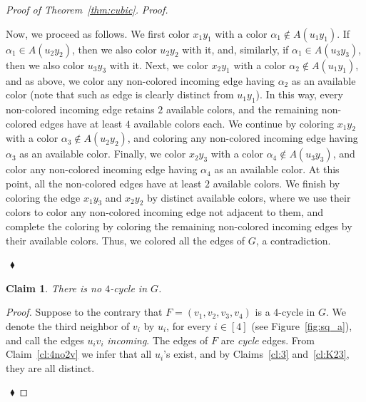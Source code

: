 \documentclass[12pt,a4paper]{article}
\newtheorem{claim}{Claim}
\newenvironment{proofclaim}[1][]%
    {\noindent \emph{Proof.} {}{#1}{}}{$~$\hfill $~\blacklozenge$ \vspace{0.2cm}}
\begin{document}
\begin{proof}[Proof of Theorem~\ref{thm:cubic}]
\begin{proofclaim}
\begin{itemize}
				Now, we proceed as follows.
				We first color $x_1y_1$ with a color $\alpha_1 \notin A(u_1y_1)$. 
				If $\alpha_1 \in A(u_2y_2)$, then we also color $u_2y_2$ with it, 
				and, similarly, if $\alpha_1 \in A(u_3y_3)$, then we also color $u_3y_3$ with it.
				Next, we color $x_2y_1$ with a color $\alpha_2 \notin A(u_1y_1)$, 
				and as above, we color any non-colored incoming edge having $\alpha_2$ as an available color 
				(note that such as edge is clearly distinct from $u_1y_1$). 
				In this way, every non-colored incoming edge retains $2$ available colors,
				and the remaining non-colored edges have at least $4$ available colors each.
				We continue by coloring $x_1y_2$ with a color $\alpha_3 \notin A(u_2y_2)$,
				and coloring any non-colored incoming edge having $\alpha_3$ as an available color.
				Finally, we color $x_2y_3$ with a color $\alpha_4 \notin A(u_3y_3)$,
				and color any non-colored incoming edge having $\alpha_4$ as an available color.
				At this point, all the non-colored edges have at least $2$ available colors.
				We finish by coloring the edge $x_1y_3$ and $x_2y_2$ by distinct available colors, 
				where we use their colors to color any non-colored incoming edge not adjacent to them,
				and complete the coloring by coloring the remaining non-colored incoming edges by their available colors.
				Thus, we colored all the edges of $G$, a contradiction.
		\end{itemize}
	\end{proofclaim}
	
	
	\begin{claim}
		\label{cl:4}
		There is no $4$-cycle in $G$.
	\end{claim}
	
	\begin{proofclaim}
		Suppose to the contrary that $F = (v_1,v_2,v_3,v_4)$ is a $4$-cycle in $G$. 
		We denote the third neighbor of $v_i$ by $u_i$, for every $i \in [4]$
		(see Figure~\ref{fig:sq_a}), and call the edges $u_iv_i$ \textit{incoming}. 
		The edges of $F$ are \textit{cycle} edges.
		From Claim~\ref{cl:4no2v} we infer that all $u_i$'s exist,
		and by Claims~\ref{cl:3} and~\ref{cl:K23}, they are all distinct.
		

\end{proofclaim}
\end{proof}
\end{document}
